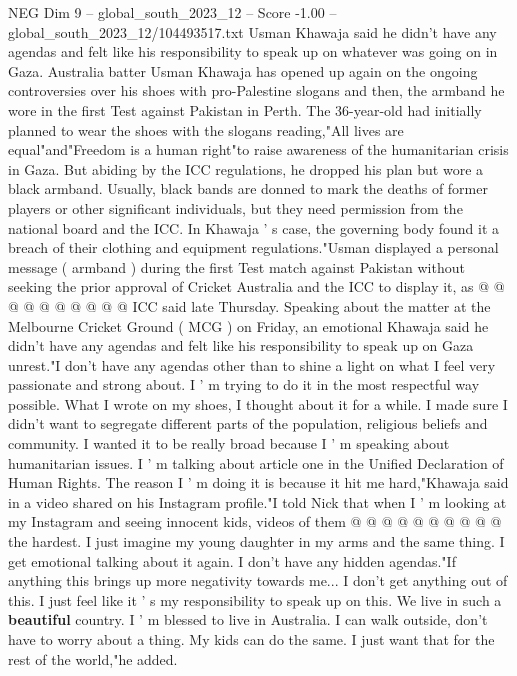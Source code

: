 \begin{textsample}{NEG Dim 9 – global\_south\_2023\_12 – Score -1.00 – global\_south\_2023\_12/104493517.txt}  \label{ex:f9_neg_442}
Usman Khawaja said he didn't have any agendas and felt like his responsibility to speak up on whatever was going on in Gaza.
Australia batter Usman Khawaja has opened up again on the ongoing controversies over his shoes with pro-Palestine slogans and then, the armband he wore in the first Test against Pakistan in Perth.
The 36-year-old had initially planned to wear the shoes with the slogans reading,"All lives are equal"and"Freedom is a human right"to raise awareness of the humanitarian crisis in Gaza.
But abiding by the ICC regulations, he dropped his plan but wore a black armband.
Usually, black bands are donned to mark the deaths of former players or other significant individuals, but they need permission from the national board and the ICC.
In Khawaja ' s case, the governing body found it a breach of their clothing and equipment regulations."Usman displayed a personal message ( armband ) during the first Test match against Pakistan without seeking the prior approval of Cricket Australia and the ICC to display it, as @ @ @ @ @ @ @ @ @ @ ICC said late Thursday.
Speaking about the matter at the Melbourne Cricket Ground ( MCG ) on Friday, an emotional Khawaja said he didn't have any agendas and felt like his responsibility to speak up on Gaza unrest."I don't have any agendas other than to shine a light on what I feel very passionate and strong about.
I ' m trying to do it in the most respectful way possible.
What I wrote on my shoes, I thought about it for a while.
I made sure I didn't want to segregate different parts of the population, religious beliefs and community.
I wanted it to be really broad because I ' m speaking about humanitarian issues.
I ' m talking about article one in the Unified Declaration of Human Rights.
The reason I ' m doing it is because it hit me hard,"Khawaja said in a video shared on his Instagram profile."I told Nick that when I ' m looking at my Instagram and seeing innocent kids, videos of them @ @ @ @ @ @ @ @ @ @ the hardest.
I just imagine my young daughter in my arms and the same thing.
I get emotional talking about it again.
I don't have any hidden agendas."If anything this brings up more negativity towards me...
I don't get anything out of this.
I just feel like it ' s my responsibility to speak up on this.
We live in such a \textbf{beautiful} country.
I ' m blessed to live in Australia.
I can walk outside, don't have to worry about a thing.
My kids can do the same.
I just want that for the rest of the world,"he added.

\end{textsample}
